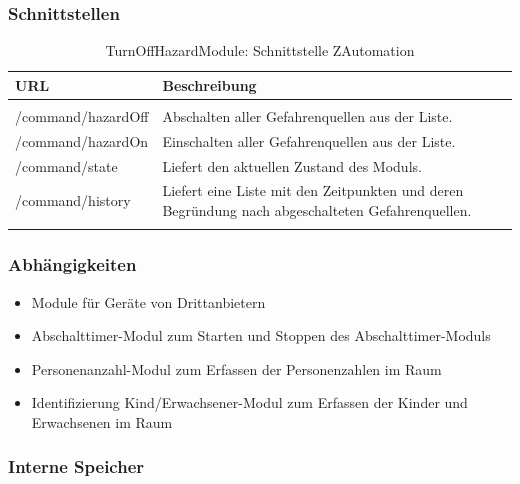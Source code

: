 \subsubsection{Schnittstellen}
\begin{longtabu} to 
	\hline
	\textbf{URL}				& \textbf{Beschreibung} \\
	\hline
	\endhead
	
	  \\
	\endfoot
	\endlastfoot
	/command/hazardOff			& Abschalten aller Gefahrenquellen aus der Liste. \\
	\hline
	/command/hazardOn			& Einschalten aller Gefahrenquellen aus der Liste. \\
	\hline 
	/command/state				& Liefert den aktuellen Zustand des Moduls. \\
	\hline
	/command/history			& Liefert eine Liste mit den Zeitpunkten und deren Begründung nach abgeschalteten Gefahrenquellen. \\
	\hline
	
	\caption{TurnOffHazardModule: Schnittstelle ZAutomation}
\end{longtabu}

\subsubsection{Abhängigkeiten}
\begin{itemize}
	\item Module für Geräte von Drittanbietern
	\item Abschalttimer-Modul zum Starten und Stoppen des Abschalttimer-Moduls
	\item Personenanzahl-Modul zum Erfassen der Personenzahlen im Raum
	\item Identifizierung Kind/Erwachsener-Modul zum Erfassen der Kinder und Erwachsenen im Raum
\end{itemize}


\subsubsection{Interne Speicher}

